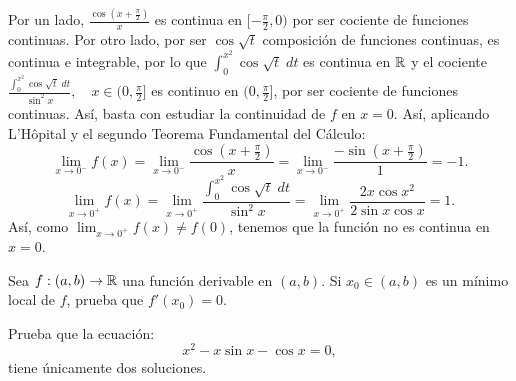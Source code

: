 \documentclass{article}
\begin{document}
\begin{sol}
Por un lado, $\displaystyle \frac{\cos\left(x+\frac{\pi }{2}\right)}{x} $ es continua en $\displaystyle [-\frac{\pi }{2}, 0) $ por ser cociente de funciones continuas. Por otro lado, por ser $\displaystyle \cos \sqrt{t} $ composición de funciones continuas, es continua e integrable, por lo que $\displaystyle \int^{x^{2}}_{0} \cos \sqrt{t} \; dt $ es continua en $\displaystyle \mathbb{R} $ y el cociente $\displaystyle \frac{\int^{x^{2}}_{0} \cos \sqrt{t} \; dt}{\sin ^{2}x}, \quad x \in (0, \frac{\pi }{2}] $ es continuo en $\displaystyle (0, \frac{\pi }{2}] $, por ser cociente de funciones continuas. 
Así, basta con estudiar la continuidad de $\displaystyle f $ en $\displaystyle x = 0 $. Así, aplicando L'Hôpital y el segundo Teorema Fundamental del Cálculo:
\[\lim_{x \to 0^{-}}f\left(x\right) = \lim_{x \to 0^{-}}\frac{\cos\left(x+\frac{\pi }{2}\right)}{x}= \lim_{x \to 0^{-}}\frac{-\sin\left(x+\frac{\pi }{2}\right)}{1}=-1 .\]
\[\lim_{x \to 0^{+}}f\left(x\right) = \lim_{x \to 0^{+}} \frac{\int^{x^{2}}_{0} \cos \sqrt{t} \; dt}{\sin ^{2}x} = \lim_{x \to 0^{+}}\frac{2x \cos x^{2}}{2\sin x \cos x}=1.\]
Así, como $\displaystyle \lim_{x \to 0^{+}}f\left(x\right) \neq f\left(0\right) $, tenemos que la función no es continua en $\displaystyle x = 0 $.
\end{sol}
\begin{ej}
Sea $\displaystyle f: \left(a,b\right)\to \mathbb{R} $ una función derivable en $\displaystyle \left(a,b\right) $. Si $\displaystyle x_{0} \in \left(a,b\right) $ es un mínimo local de $\displaystyle f $, prueba que $\displaystyle f'\left(x_{0}\right) = 0 $.
\end{ej}
\begin{ej}
Prueba que la ecuación:
\[x^{2}-x\sin x-\cos x = 0 ,\]
tiene únicamente dos soluciones.
\end{ej}
\end{document}
